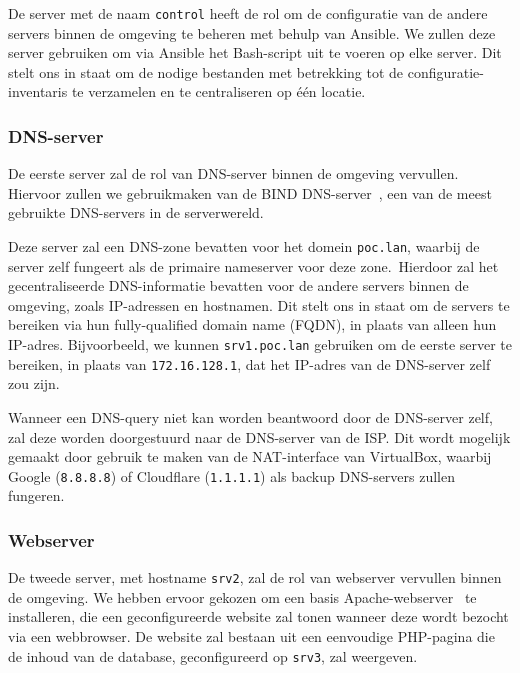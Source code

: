 De server met de naam \texttt{control} heeft de rol om de configuratie van de andere servers binnen de omgeving te beheren met behulp van Ansible.
We zullen deze server gebruiken om via Ansible het Bash-script uit te voeren op elke server.
Dit stelt ons in staat om de nodige bestanden met betrekking tot de configuratie-inventaris te verzamelen en te centraliseren op \'e\'en locatie.

\subsubsection{DNS-server}
\label{poc_dns_server}

De eerste server zal de rol van DNS-server binnen de omgeving vervullen.
Hiervoor zullen we gebruikmaken van de BIND DNS-server~\autocite{bind-home}, een van de meest gebruikte DNS-servers in de serverwereld.

Deze server zal een DNS-zone bevatten voor het domein \texttt{poc.lan}, waarbij de server zelf fungeert als de primaire nameserver voor deze zone.\
Hierdoor zal het gecentraliseerde DNS-informatie bevatten voor de andere servers binnen de omgeving, zoals IP-adressen en hostnamen.
Dit stelt ons in staat om de servers te bereiken via hun fully-qualified domain name (FQDN), in plaats van alleen hun IP-adres.
Bijvoorbeeld, we kunnen \texttt{srv1.poc.lan} gebruiken om de eerste server te bereiken, in plaats van \texttt{172.16.128.1}, dat het IP-adres van de DNS-server zelf zou zijn.

Wanneer een DNS-query niet kan worden beantwoord door de DNS-server zelf, zal deze worden doorgestuurd naar de DNS-server van de ISP.
Dit wordt mogelijk gemaakt door gebruik te maken van de NAT-interface van VirtualBox, waarbij Google (\texttt{8.8.8.8}) of Cloudflare (\texttt{1.1.1.1}) als backup DNS-servers zullen fungeren.

\subsubsection{Webserver}
\label{poc_webserver}

De tweede server, met hostname \texttt{srv2}, zal de rol van webserver vervullen binnen de omgeving.
We hebben ervoor gekozen om een basis Apache-webserver~\autocite{apache-home} te installeren, die een geconfigureerde website zal tonen wanneer deze wordt bezocht via een webbrowser.
De website zal bestaan uit een eenvoudige PHP-pagina die de inhoud van de database, geconfigureerd op \texttt{srv3}, zal weergeven.


